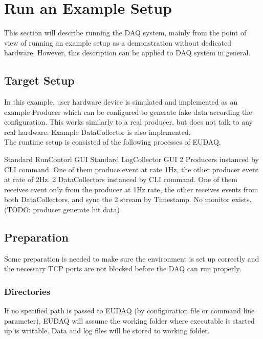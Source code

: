 \section{Run an Example Setup}
This section will describe running the DAQ system, mainly from the point of view of running an example setup as a demonstration without dedicated hardware.
However, this description can be applied to DAQ system in general.

\subsection{Target Setup}
In this example, user hardware device is simulated and implemented as an example Producer which can be configured to generate fake data according the configuration. This works similarly to a real producer, but does not talk to any real hardware. Example DataCollector is also implemented. \\
The runtime setup is consisted of the following processes of EUDAQ.
\begin{description}
Standard RunContorl GUI
Standard LogCollector GUI
2 Producers instanced by CLI command. One of them produce event at rate 1Hz, the other producer event at rate of 2Hz.
2 DataCollectors instanced by CLI command. One of them receives event only from the producer at 1Hz rate, the other receives events from both DataCollectors, and sync the 2 stream by Timestamp.
No monitor exists. (TODO: producer generate hit data)
\end{description}

\subsection{Preparation}
Some preparation is needed to make sure the environment is set up correctly and
the necessary TCP ports are not blocked before the DAQ can run properly.

\subsubsection{Directories}
If no specified path is passed to EUDAQ (by configuration file or command line parameter), EUDAQ will assume the working folder where executable is started up  is writable. Data and log files will be stored to working folder.

